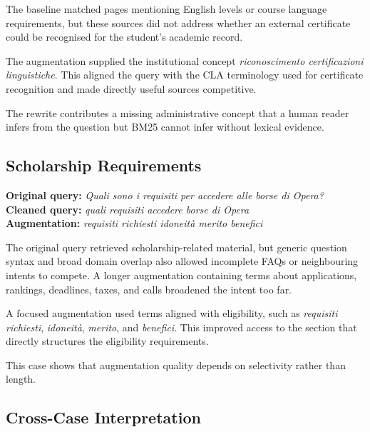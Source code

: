 \begin{failurebox}
The baseline matched pages mentioning English levels or course language requirements, but these sources did not address whether an external certificate could be recognised for the student's academic record.
\end{failurebox}

\begin{effectbox}
The augmentation supplied the institutional concept \emph{riconoscimento certificazioni linguistiche}. This aligned the query with the CLA terminology used for certificate recognition and made directly useful sources competitive.
\end{effectbox}

The rewrite contributes a missing administrative concept that a human reader infers from the question but BM25 cannot infer without lexical evidence.

\subsection{Scholarship Requirements}

\textbf{Original query:} \emph{Quali sono i requisiti per accedere alle borse di Opera?}\\
\textbf{Cleaned query:} \emph{quali requisiti accedere borse di Opera}\\
\textbf{Augmentation:} \emph{requisiti richiesti idoneità merito benefici}

\begin{failurebox}
The original query retrieved scholarship-related material, but generic question syntax and broad domain overlap also allowed incomplete FAQs or neighbouring intents to compete. A longer augmentation containing terms about applications, rankings, deadlines, taxes, and calls broadened the intent too far.
\end{failurebox}

\begin{effectbox}
A focused augmentation used terms aligned with eligibility, such as \emph{requisiti richiesti}, \emph{idoneità}, \emph{merito}, and \emph{benefici}. This improved access to the section that directly structures the eligibility requirements.
\end{effectbox}

This case shows that augmentation quality depends on selectivity rather than length.

\subsection{Cross-Case Interpretation}

